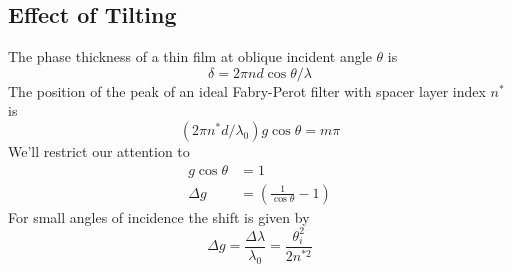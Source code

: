 \documentclass{article}
\begin{document}
\subsection{Effect of Tilting}
    The phase thickness of a thin film at oblique incident angle $\theta$ is
    \begin{equation}
        \delta = 2 \pi n d \cos \theta / \lambda        
    \end{equation}
    The position of the peak of an ideal Fabry-Perot filter with spacer layer index $n^*$ is
    \begin{equation}
        (2 \pi n^* d/\lambda_0) g \cos \theta = m \pi
    \end{equation}
    We'll restrict our attention to
    \begin{align*}
        g \cos \theta &= 1 \\
        \Delta g &= \left(\frac{1}{\cos \theta} - 1\right)
    \end{align*}
    For small angles of incidence the shift is given by
    \begin{equation}
        \Delta g = \frac{\Delta \lambda}{\lambda_0} = \frac{\theta_i^2}{2 n^{*2}}        
    \end{equation}
\end{document}
